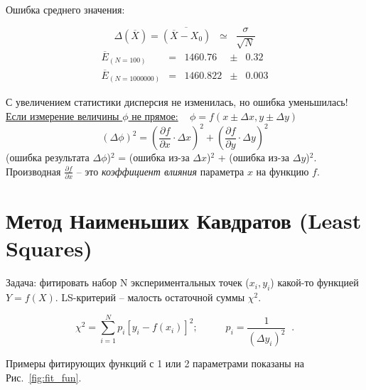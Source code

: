   Ошибка среднего значения:

 \begin{displaymath}
    \Delta(\overline{X}) = \overline{(\overline{X}-X_0)}\;\;\simeq\;\; \frac{\sigma}{\sqrt{N}}
 \end{displaymath}
 \begin{displaymath}
  \begin{array}{lclcl}
   \overline{E}_{(N=100)}     &=& 1460.76  & \pm & 0.32\\
   \overline{E}_{(N=1000000)} &=& 1460.822 & \pm & 0.003
  \end{array}
 \end{displaymath}
 
С увеличением статистики дисперсия не изменилась, но ошибка уменьшилась!
 \\[3mm]

\underline{Если измерение величины $\phi$ не прямое:} $\;\;\;\phi = f(x\pm\Delta x,y\pm \Delta y)$
 \begin{displaymath}
(\Delta\phi)^2 = \left(\frac{\partial f}{\partial x}\cdot\Delta x\right)^2 +
                 \left(\frac{\partial f}{\partial y}\cdot\Delta y\right)^2
 \end{displaymath}
(ошибка результата $\Delta\phi$)$^2$ = (ошибка из-за $\Delta x$)$^2$ + (ошибка из-за $\Delta y$)$^2$.\\ Производная $\frac{\partial f}{\partial x}$ -- это  {\em коэффициент влияния} параметра $x$ на функцию $f$.

\section{Метод Наименьших Кавдратов (Least Squares)}

Задача: фитировать набор N экспериментальных точек ($x_i,y_i$) какой-то
функцией $Y=f(X)$. LS-критерий -- малость остаточной суммы $\chi^2$.

 \begin{displaymath}
\chi^2 = \sum_{i=1}^N p_i\left[y_i - f(x_i)\right]^2;\;\;\;\;\;\;\;\;\;\;
p_i = \frac{1}{\left(\Delta y_i\right)^2}\;\;.
 \end{displaymath}
 
Примеры фитирующих функций с 1 или 2 параметрами показаны на Рис.~\ref{fig:fit_fun}.


